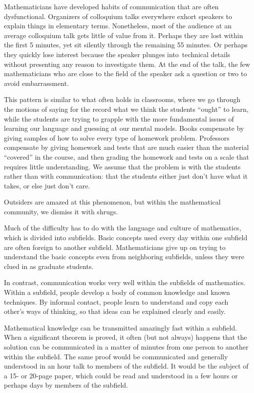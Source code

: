 \documentclass[12pt,oneside]{amsart}
\begin{document}
Mathematicians have 
developed habits of communication that are often 
dysfunctional. Organizers
of colloquium talks everywhere exhort speakers to explain 
things in 
elementary terms.  Nonetheless, most of the audience at an 
average 
colloquium talk gets little of value from it.  
Perhaps they are lost within the first
5 minutes, yet sit silently through the remaining 55 
minutes. Or perhaps they
quickly lose interest because the speaker plunges
into\ technical details
without presenting any reason to investigate them.   
At the end of the talk, the few mathematicians who are 
close to the field
of the speaker ask a question or two to avoid 
embarrassment.  

This pattern is similar to what often holds in 
classrooms, where we go through the motions of 
saying for the record what we think the students ``ought'' 
to learn,
while the students are trying to grapple with the more 
fundamental issues of
learning our language and guessing at our mental models.   
Books compensate
by giving samples of how to solve every type of homework 
problem.
Professors compensate by giving homework and tests that 
are much easier than
the material ``covered'' in the course, and then grading 
the homework
and tests on a scale that requires little understanding.
We assume that the problem is with the students rather 
than with
communication: that the students either just don't have 
what it takes,
or else just don't care.

Outsiders are amazed at this phenomenon, but within the
mathematical community, we dismiss it with shrugs.

\smallskip

Much of the difficulty has to do with 
the language and culture of mathematics, which is divided 
into 
subfields.   Basic concepts used every day 
within one subfield are often foreign to another subfield.
Mathematicians give up on trying to understand the basic 
concepts even 
from neighboring subfields, unless they were clued in as 
graduate 
students.

In contrast, communication works very well within the 
subfields
of mathematics. Within a subfield, people develop a body
of common knowledge and known techniques.   By informal 
contact, people 
learn to understand and copy each other's ways of thinking,
so that ideas can be explained clearly and easily.

Mathematical
knowledge can be transmitted amazingly fast within a 
subfield.  When a 
significant theorem is proved, it often (but not always) 
happens that
the solution can be communicated in a matter of minutes 
from one person
to another within the subfield.  The same proof would be 
communicated and
generally understood in an hour talk to members of the 
subfield.   It
would be the subject of a 15- or 20-page paper, which 
could be read and
understood in a few hours or perhaps days by members of 
the subfield.
\end{document}
